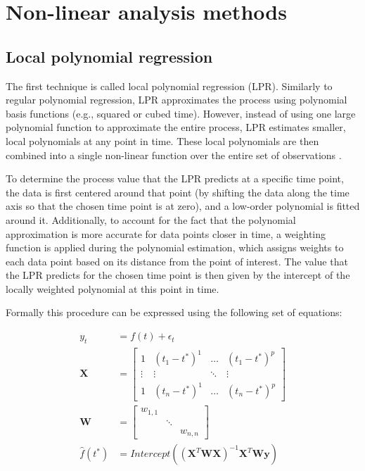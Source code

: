 \documentclass[man, floatsintext]{apa7}
\begin{document}
\section{Non-linear analysis methods}\label{method_introduction}

\subsection{Local polynomial regression}

The first technique is called local polynomial regression (LPR). Similarly to
regular polynomial regression, LPR approximates the process using polynomial
basis functions (e.g., squared or cubed time). However, instead of using one
large polynomial function to approximate the entire process, LPR estimates
smaller, local polynomials at any point in time. These local polynomials are
then combined into a single non-linear function over the entire set of
observations \parencite{fan_adaptive_1995, ruppert_multivariate_1994,
  fan_local_2018}.

To determine the process value that the LPR predicts at a specific time point,
the data is first centered around that point (by shifting the data along the
time axis so that the chosen time point is at zero), and a low-order polynomial
is fitted around it. Additionally, to account for the fact that the polynomial
approximation is more accurate for data points closer in time, a weighting
function is applied during the polynomial estimation, which assigns weights to
each data point based on its distance from the point of interest. The value
that the LPR predicts for the chosen time point is then given by the intercept
of the locally weighted polynomial at this point in time.

Formally this procedure can be expressed using the following set of equations:

\begin{equation} \label{eq:lpr_equations}
  \begin{aligned}
    y_t          & = f(t) + \epsilon_t                            \\
    \textbf{X}   & =
    \begin{bmatrix}
      1      & (t_1 - t^*)^1 & \dots  & (t_1 - t^*)^p \\
      \vdots & \vdots        & \ddots & \vdots        \\
      1      & (t_n - t^*)^1 & \dots  & (t_n - t^*)^p
    \end{bmatrix} \\
    \textbf{W}   & =
    \begin{bmatrix}
      w_{1, 1} &        &          \\
               & \ddots &          \\
               &        & w_{n, n}
    \end{bmatrix}                               \\
    \hat{f}(t^*) & =
    Intercept((\textbf{X}^T\textbf{WX})^{-1}\textbf{X}^T\textbf{Wy})
  \end{aligned}
\end{equation}
\end{document}
